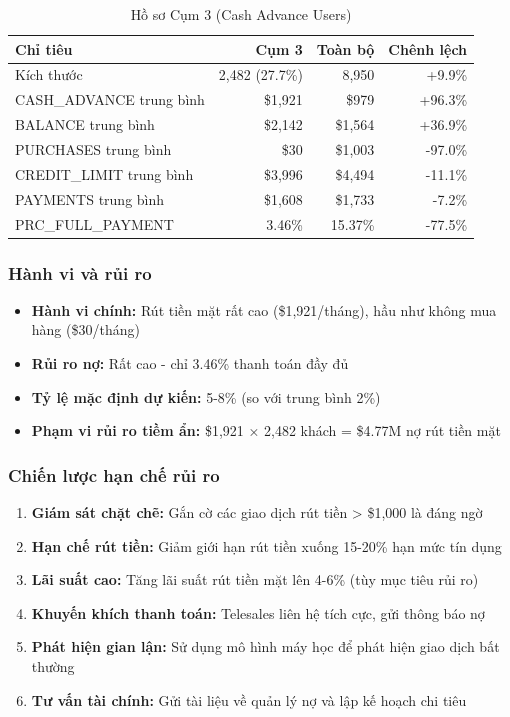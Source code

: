 \begin{table}[H]
\centering
\caption{Hồ sơ Cụm 3 (Cash Advance Users)}
\begin{tabular}{|l|r|r|r|}
\hline
\textbf{Chỉ tiêu} & \textbf{Cụm 3} & \textbf{Toàn bộ} & \textbf{Chênh lệch} \\
\hline
Kích thước & 2,482 (27.7\%) & 8,950 & +9.9\% \\
\hline
CASH\_ADVANCE trung bình & \$1,921 & \$979 & +96.3\% \\
\hline
BALANCE trung bình & \$2,142 & \$1,564 & +36.9\% \\
\hline
PURCHASES trung bình & \$30 & \$1,003 & -97.0\% \\
\hline
CREDIT\_LIMIT trung bình & \$3,996 & \$4,494 & -11.1\% \\
\hline
PAYMENTS trung bình & \$1,608 & \$1,733 & -7.2\% \\
\hline
PRC\_FULL\_PAYMENT & 3.46\% & 15.37\% & -77.5\% \\
\hline
\end{tabular}
\end{table}

\subsubsection{Hành vi và rủi ro}

\begin{itemize}
    \item \textbf{Hành vi chính:} Rút tiền mặt rất cao (\$1,921/tháng), hầu như không mua hàng (\$30/tháng)
    \item \textbf{Rủi ro nợ:} Rất cao - chỉ 3.46\% thanh toán đầy đủ
    \item \textbf{Tỷ lệ mặc định dự kiến:} 5-8\% (so với trung bình 2\%)
    \item \textbf{Phạm vi rủi ro tiềm ẩn:} \$1,921 × 2,482 khách = \$4.77M nợ rút tiền mặt
\end{itemize}

\subsubsection{Chiến lược hạn chế rủi ro}

\begin{enumerate}
    \item \textbf{Giám sát chặt chẽ:} Gắn cờ các giao dịch rút tiền > \$1,000 là đáng ngờ
    \item \textbf{Hạn chế rút tiền:} Giảm giới hạn rút tiền xuống 15-20\% hạn mức tín dụng
    \item \textbf{Lãi suất cao:} Tăng lãi suất rút tiền mặt lên 4-6\% (tùy mục tiêu rủi ro)
    \item \textbf{Khuyến khích thanh toán:} Telesales liên hệ tích cực, gửi thông báo nợ
    \item \textbf{Phát hiện gian lận:} Sử dụng mô hình máy học để phát hiện giao dịch bất thường
    \item \textbf{Tư vấn tài chính:} Gửi tài liệu về quản lý nợ và lập kế hoạch chi tiêu
\end{enumerate}

